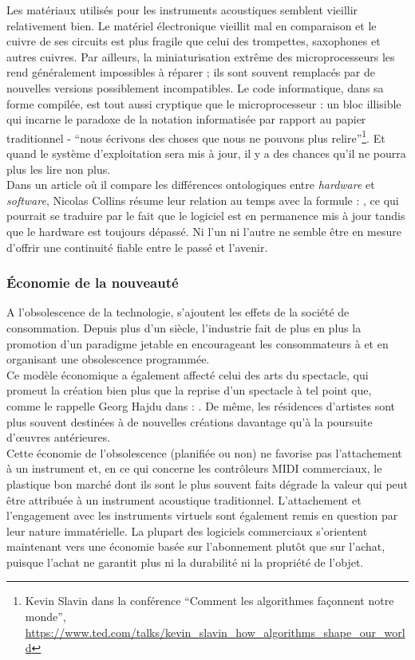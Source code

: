 \noindent Les matériaux utilisés pour les instruments acoustiques semblent vieillir relativement bien. Le matériel électronique vieillit mal en comparaison et le cuivre de ses circuits est plus fragile que celui des trompettes, saxophones et autres cuivres. Par ailleurs, la miniaturisation extrême des microprocesseurs les rend généralement impossibles à réparer ; ils sont souvent remplacés par de nouvelles versions possiblement incompatibles. Le code informatique, dans sa forme compilée, est tout aussi cryptique que le microprocesseur : un bloc illisible qui incarne le paradoxe de la notation informatisée par rapport au papier traditionnel - ``nous écrivons des choses que nous ne pouvons plus relire''\footnote{Kevin Slavin dans la conférence ``Comment les algorithmes façonnent notre monde'', \url{https://www.ted.com/talks/kevin_slavin_how_algorithms_shape_our_world}}. Et quand le système d'exploitation sera mis à jour, il y a des chances qu'il ne pourra plus les lire non plus.\\
\indent Dans un article où il compare les différences ontologiques entre \textit{hardware} et \textit{software}, Nicolas Collins \cite{collins_semiconducting_2013} résume leur relation au temps avec la formule : , ce qui pourrait se traduire par le fait que le logiciel est en permanence mis à jour tandis que le hardware est toujours dépassé. Ni l'un ni l'autre ne semble être en mesure d'offrir une continuité fiable entre le passé et l'avenir.

	
\subsubsection{Économie de la nouveauté}

\noindent A l'obsolescence de la technologie, s'ajoutent les effets de la société de consommation. Depuis plus d'un siècle, l'industrie fait de plus en plus la promotion d'un paradigme jetable en encourageant les consommateurs à  \cite{slade_made_2006} et en organisant une obsolescence programmée.\\
\indent Ce modèle économique a également affecté celui des arts du spectacle, qui promeut la création bien plus que la reprise d'un spectacle à tel point que, comme le rappelle Georg Hajdu dans \cite{hajdu_disposable_2016} : . De même, les résidences d'artistes sont plus souvent destinées à de nouvelles créations davantage qu'à la poursuite d'œuvres antérieures.\\
\indent Cette économie de l'obsolescence (planifiée ou non) ne favorise pas l'attachement à un instrument et, en ce qui concerne les contrôleurs MIDI commerciaux, le plastique bon marché dont ils sont le plus souvent faits dégrade la valeur qui peut être attribuée à un instrument acoustique traditionnel. L'attachement et l'engagement avec les instruments virtuels sont également remis en question par leur nature immatérielle. La plupart des logiciels commerciaux s'orientent maintenant vers une économie basée sur l'abonnement plutôt que sur l'achat, puisque l'achat ne garantit plus ni la durabilité ni la propriété de l'objet.

